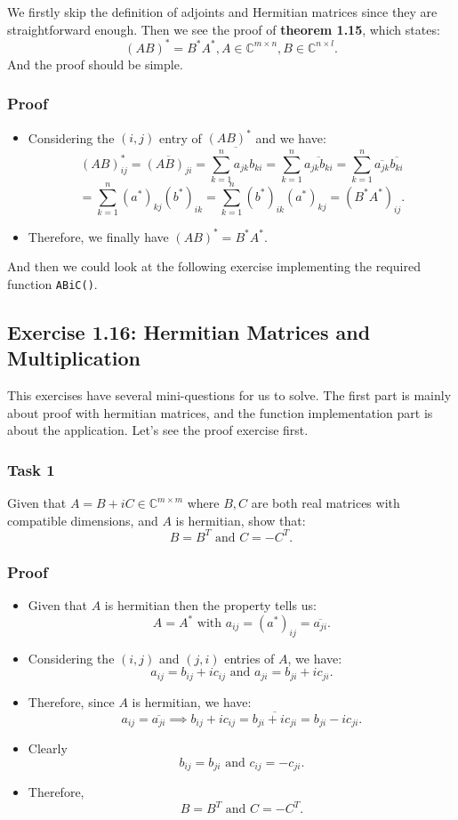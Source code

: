 We firstly skip the definition of adjoints and Hermitian matrices since they are straightforward enough. Then we see the proof of \textbf{theorem 1.15}, which states:
\[ 
  (AB)^{*} = B^{*}A^{*}, A \in \mathbb{C}^{m \times n}, B \in \mathbb{C}^{n \times l}
.\] 
And the proof should be simple.
\subsubsection*{Proof}
\begin{itemize}
  \item Considering the $(i, j)$ entry of $(AB)^{*}$ and we have:
    \[
      (AB)^{*}_{ij} = \overline{(AB)_{ji}}=\overline{\sum_{k=1}^{n} a_{jk}b_{ki}} = \sum_{k=1}^{n} \overline{a_{jk}b_{ki}} = \sum_{k=1}^{n} \overline{a_{jk}}\overline{b_{ki}}
    \]
    \[
      = \sum_{k=1}^{n} (a^{*})_{kj} (b^{*})_{ik} = \sum_{k=1}^{n} (b^{*})_{ik} (a^{*})_{kj} = (B^{*}A^{*})_{ij}
    .\]
  \item Therefore, we finally have $(AB)^{*} = B^{*}A^{*}$.
\end{itemize}
And then we could look at the following exercise implementing the required function \texttt{ABiC()}.
\subsection*{Exercise 1.16: Hermitian Matrices and Multiplication}%
This exercises have several mini-questions for us to solve. The first part is mainly about proof with hermitian matrices, and the function implementation part is about the application. Let's see the proof exercise first.

\subsubsection*{Task 1}%

\noindent Given that $A = B + iC \in \mathbb{C}^{m \times m}$ where $B, C$ are both real matrices with compatible dimensions, and  $A$ is hermitian, show that:
\[
  B = B^{T} \text{ and } C = -C^{T}
.\]
\subsubsection*{Proof}
\begin{itemize}
  \item Given that $A$ is hermitian then the property tells us:
    \[
      A = A^{* } \text{ with } a_{ij} = (a^{*})_{ij} = \overline{a_{ji}}
    .\]
  \item Considering the $ (i, j)$ and $(j, i)$ entries of $A$, we have:
    \[
    a_{ij} = b_{ij} + ic_{ij} \text{ and } a_{ji} = b_{ji} + ic_{ji}
    .\] 
  \item Therefore, since $A$ is hermitian, we have:
    \[
    a_{ij} = \overline{a_{ji}} \implies b_{ij} + ic_{ij} = \overline{b_{ji} + ic_{ji}} = b_{ji} - ic_{ji}
    .\] 
  \item Clearly
    \[
    b_{ij} = b_{ji} \text{ and } c_{ij} = -c_{ji}
    .\]
  \item Therefore,
    \[
    B = B^{T} \text{ and } C = -C^{T}
    .\] 
\end{itemize}
